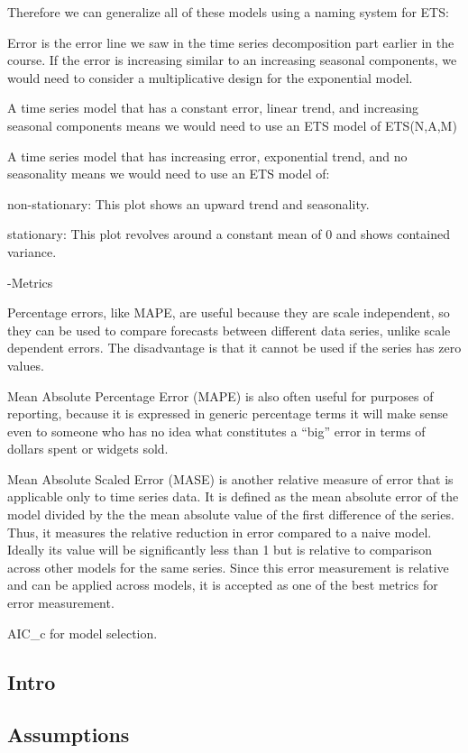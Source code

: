 \documentclass[]{book}
\begin{document}
Therefore we can generalize all of these models using a naming system
for ETS:

Error is the error line we saw in the time series decomposition part
earlier in the course. If the error is increasing similar to an
increasing seasonal components, we would need to consider a
multiplicative design for the exponential model.

A time series model that has a constant error, linear trend, and
increasing seasonal components means we would need to use an ETS model
of ETS(N,A,M)

A time series model that has increasing error, exponential trend, and no
seasonality means we would need to use an ETS model of:

non-stationary: This plot shows an upward trend and seasonality.

stationary: This plot revolves around a constant mean of 0 and shows
contained variance.

-Metrics

Percentage errors, like MAPE, are useful because they are scale
independent, so they can be used to compare forecasts between different
data series, unlike scale dependent errors. The disadvantage is that it
cannot be used if the series has zero values.

Mean Absolute Percentage Error (MAPE) is also often useful for purposes
of reporting, because it is expressed in generic percentage terms it
will make sense even to someone who has no idea what constitutes a
``big'' error in terms of dollars spent or widgets sold.

Mean Absolute Scaled Error (MASE) is another relative measure of error
that is applicable only to time series data. It is defined as the mean
absolute error of the model divided by the the mean absolute value of
the first difference of the series. Thus, it measures the relative
reduction in error compared to a naive model. Ideally its value will be
significantly less than 1 but is relative to comparison across other
models for the same series. Since this error measurement is relative and
can be applied across models, it is accepted as one of the best metrics
for error measurement.

AIC\_c for model selection.

\subsection{Intro}\label{intro-13}

\subsection{Assumptions}\label{assumptions-13}
\end{document}
